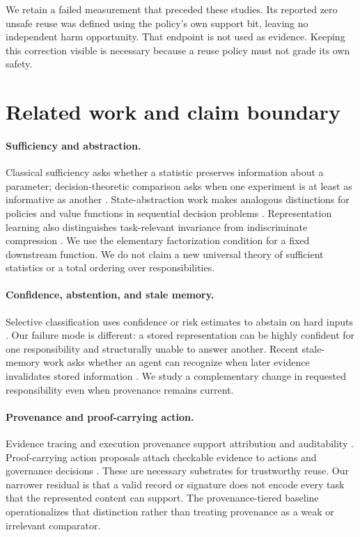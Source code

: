 \documentclass[10pt]{article}
\begin{document}
We retain a failed measurement that preceded these studies. Its reported zero unsafe reuse was defined using the policy's own support bit, leaving no independent harm opportunity. That endpoint is not used as evidence. Keeping this correction visible is necessary because a reuse policy must not grade its own safety.

\section{Related work and claim boundary}

\paragraph{Sufficiency and abstraction.}
Classical sufficiency asks whether a statistic preserves information about a parameter; decision-theoretic comparison asks when one experiment is at least as informative as another \citep{blackwell1953equivalent}. State-abstraction work makes analogous distinctions for policies and value functions in sequential decision problems \citep{li2006unified,ravindran2004approximate}. Representation learning also distinguishes task-relevant invariance from indiscriminate compression \citep{achille2018emergence}. We use the elementary factorization condition for a fixed downstream function. We do not claim a new universal theory of sufficient statistics or a total ordering over responsibilities.

\paragraph{Confidence, abstention, and stale memory.}
Selective classification uses confidence or risk estimates to abstain on hard inputs \citep{geifman2017selective}. Our failure mode is different: a stored representation can be highly confident for one responsibility and structurally unable to answer another. Recent stale-memory work asks whether an agent can recognize when later evidence invalidates stored information \citep{chao2026stale}. We study a complementary change in requested responsibility even when provenance remains current.

\paragraph{Provenance and proof-carrying action.}
Evidence tracing and execution provenance support attribution and auditability \citep{wang2026traces}. Proof-carrying action proposals attach checkable evidence to actions and governance decisions \citep{wang2026proof}. These are necessary substrates for trustworthy reuse. Our narrower residual is that a valid record or signature does not encode every task that the represented content can support. The provenance-tiered baseline operationalizes that distinction rather than treating provenance as a weak or irrelevant comparator.
\end{document}
